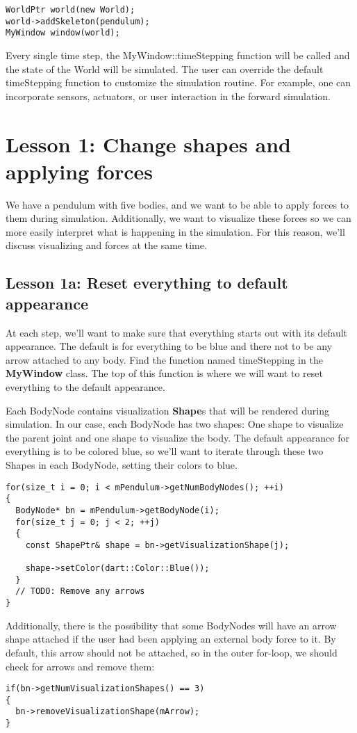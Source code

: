 \begin{lstlisting}
WorldPtr world(new World);
world->addSkeleton(pendulum);
MyWindow window(world);
\end{lstlisting}

Every single time step, the MyWindow::timeStepping function will be called and the state of the World will be simulated. The user can override the default timeStepping function to customize the simulation routine. For example, one can incorporate sensors, actuators, or user interaction in the forward simulation.

\section{Lesson 1: Change shapes and applying forces}

We have a pendulum with five bodies, and we want to be able to apply forces to them during simulation. Additionally, we want to visualize these forces so we can more easily interpret what is happening in the simulation. For this reason, we'll discuss visualizing and forces at the same time.

\subsection{Lesson 1a: Reset everything to default appearance}

At each step, we'll want to make sure that everything starts out with its default appearance. The default is for everything to be blue and there not to be any arrow attached to any body. Find the function named timeStepping in the \textbf{MyWindow} class. The top of this function is where we will want to reset everything to the default appearance.

Each BodyNode contains visualization \textbf{Shape}s that will be rendered during simulation. In our case, each BodyNode has two shapes: One shape to visualize the parent joint and one shape to visualize the body. The default appearance for everything is to be colored blue, so we'll want to iterate through these two Shapes in each BodyNode, setting their colors to blue.

\begin{lstlisting}
for(size_t i = 0; i < mPendulum->getNumBodyNodes(); ++i)
{
  BodyNode* bn = mPendulum->getBodyNode(i);
  for(size_t j = 0; j < 2; ++j)
  {
    const ShapePtr& shape = bn->getVisualizationShape(j);

    shape->setColor(dart::Color::Blue());
  }
  // TODO: Remove any arrows
}
\end{lstlisting}

Additionally, there is the possibility that some BodyNodes will have an arrow shape attached if the user had been applying an external body force to it. By default, this arrow should not be attached, so in the outer for-loop, we should check for arrows and remove them:

\begin{lstlisting}
if(bn->getNumVisualizationShapes() == 3)
{
  bn->removeVisualizationShape(mArrow);
}
\end{lstlisting}